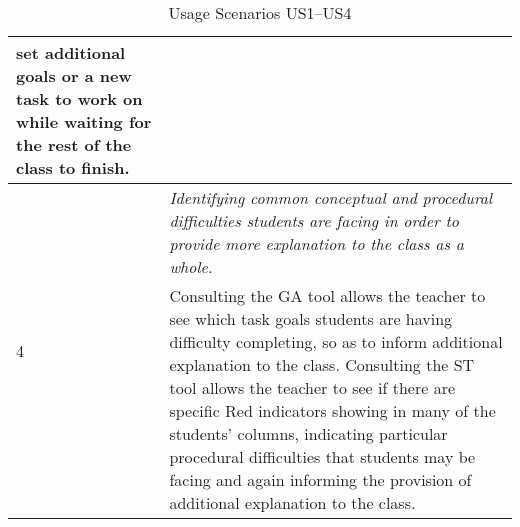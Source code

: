 \begin{table}[htbp]
\begin{tabular}{|p{0.5cm}|p{12.5cm}|}
  set additional goals or a new task to work on while waiting for the
  rest of the class to finish. \\
  \hline \multirow{2}{*}{4} & \emph{Identifying common conceptual and
    procedural difficulties students are facing in order to provide
    more explanation to the
    class as a whole.} \\
  \cline{2-2} 
  & Consulting the GA tool allows the teacher to see which
  task goals students are having difficulty completing, so as to
  inform additional explanation to the class. Consulting the ST tool
  allows the teacher to see if there are specific Red indicators
  showing in many of the students' columns, indicating particular
  procedural difficulties that students may be facing and again
  informing the provision of additional explanation to the class.\\
  \hline
  \end{tabular}
  \caption{Usage Scenarios US1--US4}
  \label{tab:UsageScenariosA}
\end{table}
 
